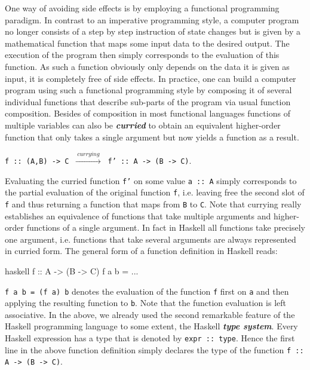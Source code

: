 \documentclass[a4paper,12pt, DIV=14, BCOR=5mm, twoside, headsepline, numbers=noenddot]{scrbook}
\begin{document}
One way of avoiding side effects is by employing a functional programming paradigm. In contrast to an imperative programming style, a computer program no longer consists of a step by step instruction of state changes but is given by a mathematical function that maps some input data to the desired output. The execution of the program then simply corresponds to the evaluation of this function. As such a function obviously only depends on the data it is given as input, it is completely free of side effects. In practice, one can build a computer program using such a functional programming style by composing it of several individual functions that describe sub-parts of the program via usual function composition. Besides of composition in most functional languages functions of multiple variables can also be  \textit{\textbf{curried}} to obtain an equivalent higher-order function that only takes a single argument but now yields a function as a result. 
\begin{center}
    \texttt{f :: (A,B) -> C} $\ \xrightarrow{ \ currying \ } \ $
    \texttt{f' :: A -> (B -> C)}.
\end{center}
Evaluating the curried function \texttt{f'} on some value \texttt{a :: A} simply corresponds to the partial evaluation of the original function \texttt{f}, i.e. leaving free the second slot of \texttt{f} and thus returning a function that maps from \texttt{B}  to \texttt{C}. Note that currying really establishes an equivalence of functions that take multiple arguments and higher-order functions of a single argument.
In fact in Haskell all functions take precisely one argument, i.e. functions that take several arguments are always represented in curried form. The general form of a function definition in Haskell reads:
\begin{center}
\begin{cminted}{haskell}
f :: A -> (B -> C)
f a b = ...  
\end{cminted}
\end{center}
\texttt{f a b = (f a) b} denotes the evaluation of the function \texttt{f} first on \texttt{a} and then applying the resulting function to \texttt{b}. Note that the function evaluation is left associative.
In the above, we already used the second remarkable feature of the  Haskell programming language to some extent, the Haskell \textbf{\textit{type system}}. Every Haskell expression has a type that is denoted by \texttt{expr :: type}. Hence the first line in the above function definition simply declares   the type of the function \texttt{f :: A -> (B -> C)}.
\end{document}
